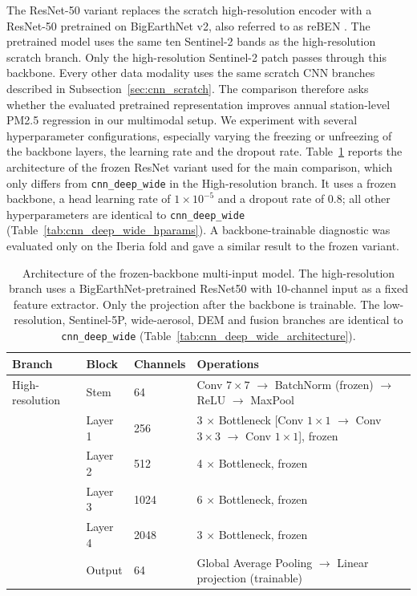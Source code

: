 \documentclass[english, a4paper]{article}
\begin{document}
The ResNet-50 variant replaces the scratch high-resolution encoder with a ResNet-50 pretrained on BigEarthNet v2, also referred to as reBEN \citep{clasen2025refinedbigearthnet}. The pretrained model uses the same ten Sentinel-2 bands as the high-resolution scratch branch. Only the high-resolution Sentinel-2 patch passes through this backbone. Every other data modality uses the same scratch CNN branches described in Subsection~\ref{sec:cnn_scratch}. The comparison therefore asks whether the evaluated pretrained representation improves annual station-level PM2.5 regression in our multimodal setup.
We experiment with several hyperparameter configurations, especially varying the freezing or unfreezing of the backbone layers, the learning rate and the dropout rate. Table~\ref{tab:resnet_frozen_architecture} reports the architecture of the frozen ResNet variant used for the main comparison, which only differs from \texttt{cnn\_deep\_wide} in the High-resolution branch. It uses a frozen backbone, a head learning rate of $1\times10^{-5}$ and a dropout rate of 0.8; all other hyperparameters are identical to \texttt{cnn\_deep\_wide} (Table~\ref{tab:cnn_deep_wide_hparams}). A backbone-trainable diagnostic was evaluated only on the Iberia fold and gave a similar result to the frozen variant.



\begin{table}[ht]
\centering
\caption{Architecture of the frozen-backbone multi-input model. The high-resolution branch uses a BigEarthNet-pretrained ResNet50 with 10-channel input as a fixed feature extractor. Only the projection after the backbone is trainable. The low-resolution, Sentinel-5P, wide-aerosol, DEM and fusion branches are identical to \texttt{cnn\_deep\_wide} (Table~\ref{tab:cnn_deep_wide_architecture}).}
\label{tab:resnet_frozen_architecture}
\begin{tabular}{llll}
\hline
\textbf{Branch} & \textbf{Block} & \textbf{Channels} & \textbf{Operations} \\
\hline
High-resolution &
Stem & 64 &
Conv $7\times7$ $\rightarrow$ BatchNorm (frozen) $\rightarrow$ ReLU $\rightarrow$ MaxPool \\
&
Layer 1 & 256 &
3 $\times$ Bottleneck [Conv $1\times1$ $\rightarrow$ Conv $3\times3$ $\rightarrow$ Conv $1\times1$], frozen \\
&
Layer 2 & 512 &
4 $\times$ Bottleneck, frozen \\
&
Layer 3 & 1024 &
6 $\times$ Bottleneck, frozen \\
&
Layer 4 & 2048 &
3 $\times$ Bottleneck, frozen \\
&
Output &
64 &
Global Average Pooling $\rightarrow$ Linear projection (trainable) \\
\hline
\end{tabular}
\end{table}
\end{document}
